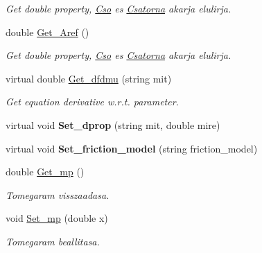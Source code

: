 \begin{DoxyCompactItemize}
\begin{DoxyCompactList}\small\item\em Get double property, \hyperlink{class_cso}{Cso} es \hyperlink{class_csatorna}{Csatorna} akarja elulirja. \end{DoxyCompactList}\item 
\hypertarget{class_agelem_a47b441de19cf771363bf25e3f65fc228}{}\label{class_agelem_a47b441de19cf771363bf25e3f65fc228} 
double \hyperlink{class_agelem_a47b441de19cf771363bf25e3f65fc228}{Get\+\_\+\+Aref} ()
\begin{DoxyCompactList}\small\item\em Get double property, \hyperlink{class_cso}{Cso} es \hyperlink{class_csatorna}{Csatorna} akarja elulirja. \end{DoxyCompactList}\item 
\hypertarget{class_agelem_a47c5952bbfa4ca32910f361ee47f6ae8}{}\label{class_agelem_a47c5952bbfa4ca32910f361ee47f6ae8} 
virtual double \hyperlink{class_agelem_a47c5952bbfa4ca32910f361ee47f6ae8}{Get\+\_\+dfdmu} (string mit)
\begin{DoxyCompactList}\small\item\em Get equation derivative w.\+r.\+t. parameter. \end{DoxyCompactList}\item 
\hypertarget{class_agelem_aa830fcc840b21486fdecd40712f3373e}{}\label{class_agelem_aa830fcc840b21486fdecd40712f3373e} 
virtual void {\bfseries Set\+\_\+dprop} (string mit, double mire)
\item 
\hypertarget{class_agelem_a1285244f5e03d7db2092a2e5c14df288}{}\label{class_agelem_a1285244f5e03d7db2092a2e5c14df288} 
virtual void {\bfseries Set\+\_\+friction\+\_\+model} (string friction\+\_\+model)
\item 
\hypertarget{class_agelem_ab1bd05d137565c3a964e31598f8e2e71}{}\label{class_agelem_ab1bd05d137565c3a964e31598f8e2e71} 
double \hyperlink{class_agelem_ab1bd05d137565c3a964e31598f8e2e71}{Get\+\_\+mp} ()
\begin{DoxyCompactList}\small\item\em Tomegaram visszaadasa. \end{DoxyCompactList}\item 
\hypertarget{class_agelem_a7d72a3740ccae5c739eaa3c7b2697c2c}{}\label{class_agelem_a7d72a3740ccae5c739eaa3c7b2697c2c} 
void \hyperlink{class_agelem_a7d72a3740ccae5c739eaa3c7b2697c2c}{Set\+\_\+mp} (double x)
\begin{DoxyCompactList}\small\item\em Tomegaram beallitasa. \end{DoxyCompactList}\item 

\end{DoxyCompactItemize}

